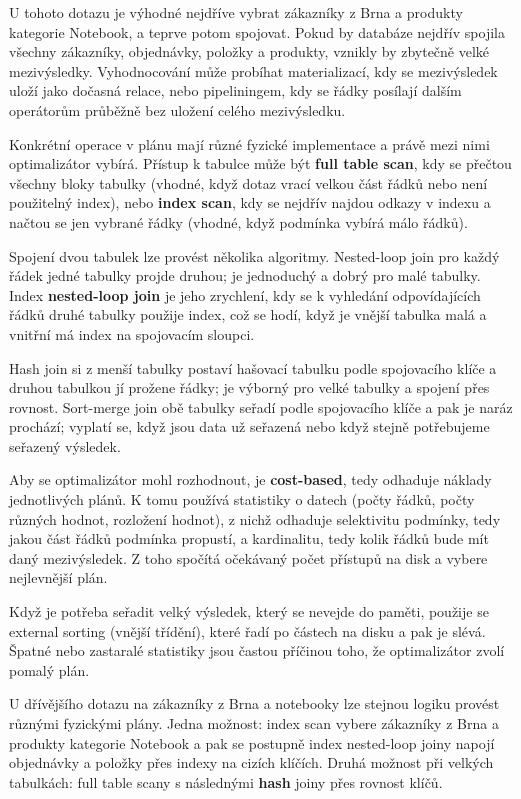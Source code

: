 \documentclass[11pt,a4paper]{article}
\begin{document}
U tohoto dotazu je výhodné nejdříve vybrat zákazníky z Brna a produkty kategorie Notebook, a teprve potom spojovat. Pokud by databáze nejdřív spojila všechny zákazníky, objednávky, položky a produkty, vznikly by zbytečně velké mezivýsledky. Vyhodnocování může probíhat materializací, kdy se mezivýsledek uloží jako dočasná relace, nebo pipeliningem, kdy se řádky posílají dalším operátorům průběžně bez uložení celého mezivýsledku.

Konkrétní operace v plánu mají různé fyzické implementace a právě mezi nimi optimalizátor vybírá. Přístup k tabulce může být \textbf{full table scan}, kdy se přečtou všechny bloky tabulky (vhodné, když dotaz vrací velkou část řádků nebo není použitelný index), nebo \textbf{index scan}, kdy se nejdřív najdou odkazy v indexu a načtou se jen vybrané řádky (vhodné, když podmínka vybírá málo řádků).

Spojení dvou tabulek lze provést několika algoritmy. Nested-loop join pro každý řádek jedné tabulky projde druhou; je jednoduchý a dobrý pro malé tabulky. Index \textbf{nested-loop join} je jeho zrychlení, kdy se k vyhledání odpovídajících řádků druhé tabulky použije index, což se hodí, když je vnější tabulka malá a vnitřní má index na spojovacím sloupci.

Hash join si z menší tabulky postaví hašovací tabulku podle spojovacího klíče a druhou tabulkou jí prožene řádky; je výborný pro velké tabulky a spojení přes rovnost. Sort-merge join obě tabulky seřadí podle spojovacího klíče a pak je naráz prochází; vyplatí se, když jsou data už seřazená nebo když stejně potřebujeme seřazený výsledek.

Aby se optimalizátor mohl rozhodnout, je \textbf{cost-based}, tedy odhaduje náklady jednotlivých plánů. K tomu používá statistiky o datech (počty řádků, počty různých hodnot, rozložení hodnot), z nichž odhaduje selektivitu podmínky, tedy jakou část řádků podmínka propustí, a kardinalitu, tedy kolik řádků bude mít daný mezivýsledek. Z toho spočítá očekávaný počet přístupů na disk a vybere nejlevnější plán.

Když je potřeba seřadit velký výsledek, který se nevejde do paměti, použije se external sorting (vnější třídění), které řadí po částech na disku a pak je slévá. Špatné nebo zastaralé statistiky jsou častou příčinou toho, že optimalizátor zvolí pomalý plán.

U dřívějšího dotazu na zákazníky z Brna a notebooky lze stejnou logiku provést různými fyzickými plány. Jedna možnost: index scan vybere zákazníky z Brna a produkty kategorie Notebook a pak se postupně index nested-loop joiny napojí objednávky a položky přes indexy na cizích klíčích. Druhá možnost při velkých tabulkách: full table scany s následnými \textbf{hash} joiny přes rovnost klíčů.
\end{document}
